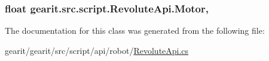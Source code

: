\hypertarget{classgearit_1_1src_1_1script_1_1_revolute_api_acadc886eeba92ddc71cb7fd7b3e369a7}{
\subsubsection[{Motor}]{\setlength{\rightskip}{0pt plus 5cm}float gearit.\+src.\+script.\+Revolute\+Api.\+Motor\hspace{0.3cm}{\ttfamily [get]}, {\ttfamily [set]}}}\label{classgearit_1_1src_1_1script_1_1_revolute_api_acadc886eeba92ddc71cb7fd7b3e369a7}


The documentation for this class was generated from the following file\+:\begin{DoxyCompactItemize}
\item 
gearit/gearit/src/script/api/robot/\hyperlink{_revolute_api_8cs}{Revolute\+Api.\+cs}\end{DoxyCompactItemize}
